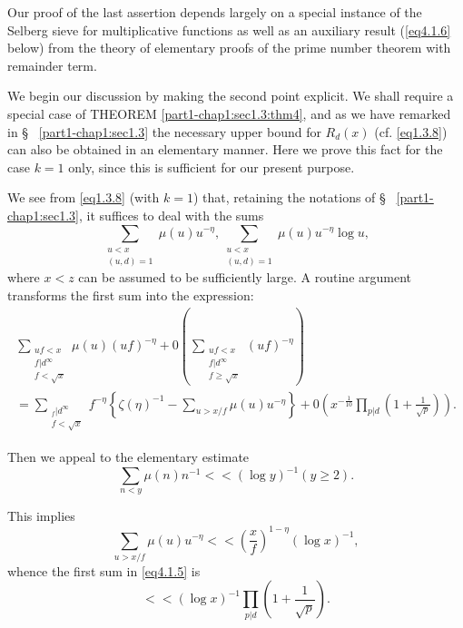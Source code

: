 Our proof of the last assertion depends largely on a special instance
of the Selberg sieve for multiplicative functions as well as an
auxiliary result (\eqref{eq4.1.6}  below) from the theory of elementary
proofs of the prime number theorem with remainder term. 

We begin our discussion by making the second point explicit. We shall
require a special case of THEOREM \ref{part1-chap1:sec1.3:thm4}, and as we have
remarked in \S~ \ref{part1-chap1:sec1.3} the necessary upper bound for $R_d
(x) $ (cf. \eqref{eq1.3.8}) can also 
be obtained in an elementary manner. Here we prove this fact for the
case $k = 1$ only, since this is sufficient for our present purpose. 

We see from \eqref{eq1.3.8} (with $k = 1$) that, retaining the notations of
\S~ \ref{part1-chap1:sec1.3}, it suffices to deal with the sums  
\begin{equation*}
  \sum_{\substack{u < x \\ (u, d) = 1}} \mu (u)u^{-\eta},
  \sum_{\substack{u < x \\ (u, d) = 1}} \mu (u) u^{-\eta} \log u,
  \tag{4.1.5} \label{eq4.1.5}
\end{equation*}
where $x < z$ can be assumed to be sufficiently large. A routine
argument transforms the first sum into the expression: 
\begin{multline*}
  \sum_{\substack{uf < x \\ f | d^{\infty}  \\ f< \sqrt{x}}} \mu (u)
  (uf)^{-\eta} + 0 \left(\sum_{\substack{uf < x \\ f | d^\infty \\ f \geq
      \sqrt{x}}} (uf)^{-\eta}\right) \\ 
  = \sum_{\substack{_f | d^{\infty}  \\ f< \sqrt{x}}} f^{-\eta} \left\{
  \zeta (\eta )^{-1} - \sum_{u > x/f} \mu (u) u^{-\eta}  \right\} + 0
  \left(x^{-\frac{1}{10}} \prod_{p | d} \left(1 +
  \frac{1}{\sqrt{p}}\right)\right).  
\end{multline*}\pageoriginale

Then we appeal to the elementary estimate
\begin{equation*}
  \sum_{n < y} \mu (n) n^{-1} < < (\log y)^{-1} (y \geq
  2). \tag{4.1.6}\label{eq4.1.6} 
\end{equation*}

This implies
$$
\sum_{u > x/f} \mu (u) u^{-\eta} << \left(\frac{x}{f}\right)^{1-\eta}
(\log x)^{-1}, 
$$
whence the first sum in \eqref{eq4.1.5} is 
$$
<< (\log x)^{-1} \prod_{p | d} \left(1 + \frac{1}{\sqrt{p}}\right).
$$

